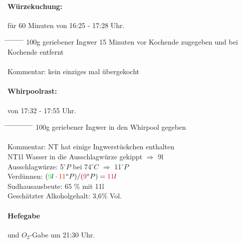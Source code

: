 \documentclass[12pt,oneside,a4paper]{scrartcl}
\begin{document}
\paragraph{Würzekuchung:} für {\color{green}60} Minuten von {\color{red}16:25} - {\color{red}17:28} Uhr.
	\begin{tabbing}
		\hspace{1cm} \= \hspace{1cm} \= \hspace{1cm} \= \hspace{1cm} \= \hspace{1cm} \= \hspace{1cm} \= \hspace{1cm} \= \hspace{1cm} \= \kill
		\> 100g geriebener Ingwer 15 Minuten vor Kochende zugegeben und bei Kochende entfernt\\\\
		\> Kommentar: \> \> \> {\color{green}kein einziges mal übergekocht}
	\end{tabbing}
%
\paragraph{Whirpoolrast:} von {\color{red}17:32} - {\color{red}17:55} Uhr.
	\begin{tabbing}
		\hspace{1cm} \= \hspace{1cm} \= \hspace{1cm} \= \hspace{1cm} \= \hspace{1cm} \= \hspace{1cm} \= \hspace{1cm} \= \hspace{1cm} \= \hspace{1cm} \= \hspace{1cm} \= \hspace{1cm} \= \hspace{1cm} \= \kill
		\> 100g geriebener Ingwer in den Whirpool gegeben\\\\
		\> Kommentar: \> \> \> {\color{green}NT hat einige Ingwerstückchen enthalten}\\
		\> \> \> \> {\color{green}NT1l Wasser in die Ausschlagwürze gekippt $\Rightarrow$ 9l}\\
		\> \> Ausschlagwürze:\> \> \> \> \>  {\color{green}5}$^\circ P$ \> bei \> {\color{green}74}$^\circ C$ \> $\Rightarrow$ \> {\color{red}11}$^\circ P$\\
		\> \> Verdünnen: \> \> \> \> \> $({\color{green}9}l \cdot {\color{red}11}^\circ P)/({\color{red}9}^\circ P)={\color{red}11}l$\\
		\> \> Sudhausausbeute: \> \> \> \> \> {\color{red}65} \% mit 11l\\
		\> \> Geschätzter Alkoholgehalt: \> \> \> \> \> {\color{red}3,6}\% Vol.
	\end{tabbing}
%
\paragraph{Hefegabe} und $O_2$-Gabe um {\color{green}21:30} Uhr.
\end{document}
